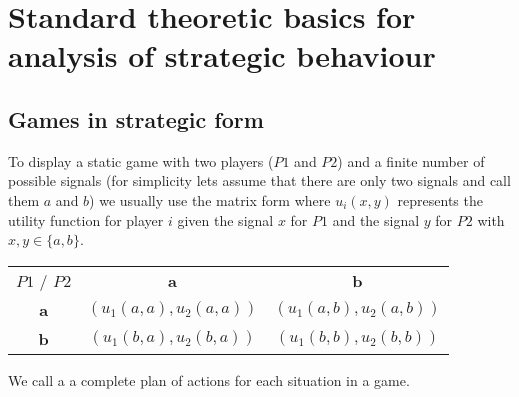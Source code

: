 

\chapter{Standard theoretic basics for analysis of strategic behaviour}


\section{Games in strategic form}
To display a static game with two players ($P1$ and $P2$) and a finite number of possible signals (for simplicity lets assume that there are only two signals and call them $a$ and $b$) we usually use the matrix form where $u_{i}(x, y)$ represents the utility function for player $i$ given the signal $x$ for $P1$ and the signal $y$ for $P2$ with $x, y \in \{ a, b\}$.
\begin{center}
	\begin{tabular}{|c|c|c|}
		\hline\hline
  			$P1$ / $P2$ & \textbf{a} & \textbf{b} \\
         		\cline{1-3}
   					\textbf{a} & $( u_{1}(a, a) , u_{2}(a, a))$ & $(u_{1}(a, b), u_{2}(a, b))$	\arrayrulewidth2pt \\
            	\cline{1-3}
   					\textbf{b} & $( u_{1}(b, a), u_{2}(b, a))$ & $(u_{1}(b, b), u_{2}(b, b))$\\ \hline\hline
	\end{tabular}	
\end{center}

We call a  a complete plan of actions for each situation in a game.


